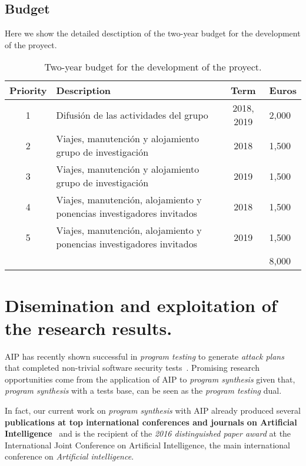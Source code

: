 \documentclass[10pt,a4paper]{paper}
\begin{document}
\subsection{Budget}
Here we show the detailed desctiption of the two-year budget for the development of the proyect.

\begin{table}[hbt!]
\begin{small}  
  \begin{tabular}{clc|l}
    {\bf Priority} & {\bf Description} & {\bf Term} & {\bf Euros} \\\hline
1 & {\scriptsize Difusión de las actividades del grupo} & 2018, 2019 & 2,000\\    
2 & {\scriptsize Viajes, manutención y alojamiento grupo de investigación} & 2018 & 1,500\\
3 & {\scriptsize Viajes, manutención y alojamiento grupo de investigación} & 2019 & 1,500\\
4 & {\scriptsize Viajes, manutención, alojamiento y ponencias investigadores invitados} & 2018 & 1,500\\
5 & {\scriptsize Viajes, manutención, alojamiento y ponencias investigadores invitados} & 2019 & 1,500\\\hline
\multicolumn{3}{l|}{} & 8,000 \\
  \end{tabular}
\end{small}
\caption{\small Two-year budget for the development of the proyect.}
\end{table}



\section{Disemination and exploitation of the research results.}
\label{subsec:beneficios}
AIP has recently shown successful in {\em program testing} to generate {\em attack plans} that completed non-trivial software security tests~\cite{hoffmann2015simulated,steinmetz2016revisiting,shmaryahu2016constructing,steinmetz2016goal}. Promising research opportunities come from the application of AIP to {\em program synthesis} given that, {\em program synthesis} with a tests base, can be seen as the {\em program testing} dual.

In fact, our current work on {\em program synthesis} with AIP already produced several {\bf publications at top international conferences and journals on Artificial Intelligence}~\cite{segovia2017generating,sergio:aprogramingb:ijcai16,sergio:aprograming:ijcai16,sergio:aprograming:icaps16,segovia:FSC:JAIR2018,segovia:programs:AIJ19} and is the recipient of the {\it 2016 distinguished paper award} at the International Joint Conference on Artificial Intelligence, the main international conference on {\em Artificial intelligence}. 
\end{document}
